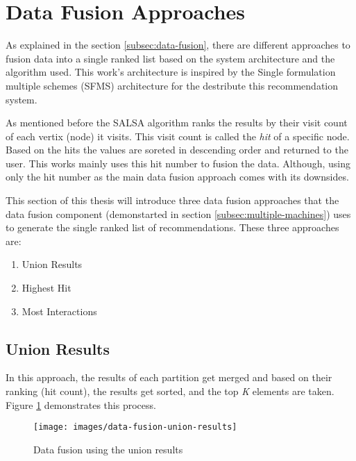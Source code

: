 \section{Data Fusion Approaches}
\label{sec:data-fusion-approaches}
As explained in the section \ref{subsec:data-fusion}, there are different approaches to fusion data into a single ranked list based on the system architecture and the algorithm used. This work's architecture is inspired by the Single formulation multiple schemes (SFMS) architecture for the destribute this recommendation system. 


As mentioned before the SALSA algorithm ranks the results by their visit count of each vertix (node) it visits. This visit count is called the \emph{hit} of a specific node. Based on the hits the values are soreted in descending order and returned to the user. This works mainly uses this hit number to fusion the data. Although, using only the hit number as the main data fusion approach comes with its downsides.


This section of this thesis will introduce three data fusion approaches that the data fusion component (demonstarted in section \ref{subsec:multiple-machines}) uses to generate the single ranked list of recommendations. These three approaches are:

\begin{enumerate}
	\item Union Results
	\item Highest Hit
	\item Most Interactions
\end{enumerate}

\subsection{Union Results}
\label{subsec:data-fusion-union-results}
In this approach, the results of each partition get merged and based on their ranking (hit count), the results get sorted, and the top \emph{K} elements are taken. Figure \ref{fig:data-fusion-union-results} demonstrates this process.


\begin{figure}[!h]
	\centering
	\texttt{[image: images/data-fusion-union-results]}
	\caption{Data fusion using the union results}
	\label{fig:data-fusion-union-results}
\end{figure}

